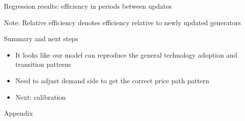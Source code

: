 \documentclass{beamer}
\begin{document}

\begin{frame}{Regression results: efficiency in periods between updates}\label{effic_between_1gen}
\scriptsize
\begin{table}
\centering
\caption{Relative efficiency in periods between updates regressed on covariates}

\end{table}
\scriptsize{Note: Relative efficiency denotes efficiency relative to newly updated generators}

\hyperlink{effic_between_all}{}

\end{frame}

\begin{frame}{Summary and next steps}
\begin{itemize}
    \item It looks like our model can reproduce the general technology adoption and transition patterns
    \item Need to adjust demand side to get the correct price path pattern
    \item Next: calibration 
\end{itemize}

\end{frame}


\appendix
\begin{frame}{Appendix}


\end{frame}
\end{document}
